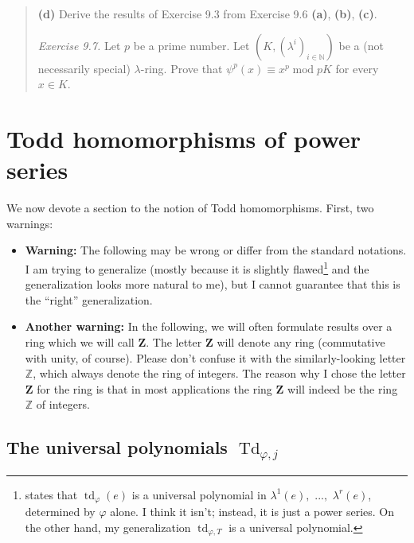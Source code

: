 \documentclass[numbers=enddot,12pt,final,onecolumn,notitlepage]{scrartcl}%
\begin{document}
\begin{quotation}
\textbf{(d)} Derive the results of Exercise 9.3 from Exercise 9.6
\textbf{(a)}, \textbf{(b)}, \textbf{(c)}.

\textit{Exercise 9.7.} Let $p$ be a prime number. Let $\left(  K,\left(
\lambda^{i}\right)  _{i\in\mathbb{N}}\right)  $ be a (not necessarily special)
$\lambda$-ring. Prove that $\psi^{p}\left(  x\right)  \equiv x^{p}%
\operatorname{mod}pK$ for every $x\in K$.

\bigskip
\end{quotation}

\section{Todd homomorphisms of power series}

We now devote a section to the notion of Todd homomorphisms. First, two warnings:

\begin{itemize}
\item \textbf{Warning:} The following may be wrong or differ from the standard
notations. I am trying to generalize \cite[I \S 6]{FulLan85} (mostly because
it is slightly flawed\footnote{\cite[I \S 6, p. 24]{FulLan85} states that
$\operatorname*{td}_{\varphi}\left(  e\right)  $ is a universal polynomial in
$\lambda^{1}\left(  e\right)  ,$ $...,$ $\lambda^{r}\left(  e\right)  $,
determined by $\varphi$ alone. I think it isn't; instead, it is just a power
series. On the other hand, my generalization $\operatorname*{td}%
\nolimits_{\varphi,T}$ is a universal polynomial.} and the generalization
looks more natural to me), but I cannot guarantee that this is the ``right'' generalization.

\item \textbf{Another warning:} In the following, we will often formulate
results over a ring which we will call $\mathbf{Z}$. The letter $\mathbf{Z}$
will denote any ring (commutative with unity, of course). Please don't confuse
it with the similarly-looking letter $\mathbb{Z}$, which always denote the
ring of integers. The reason why I chose the letter $\mathbf{Z}$ for the ring
is that in most applications the ring $\mathbf{Z}$ will indeed be the ring
$\mathbb{Z}$ of integers.
\end{itemize}

\subsection{The universal polynomials $\operatorname*{Td}\nolimits_{\varphi
,j}$}
\end{document}
